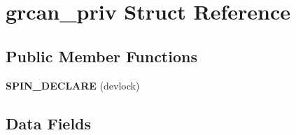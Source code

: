 \hypertarget{structgrcan__priv}{}\section{grcan\+\_\+priv Struct Reference}
\label{structgrcan__priv}
\subsection*{Public Member Functions}
\begin{DoxyCompactItemize}
\item 
\mbox{\label{structgrcan__priv_ad46187029744fa27edf8b90a94a80f0a}} 
{\bfseries S\+P\+I\+N\+\_\+\+D\+E\+C\+L\+A\+RE} (devlock)
\end{DoxyCompactItemize}
\subsection*{Data Fields}
